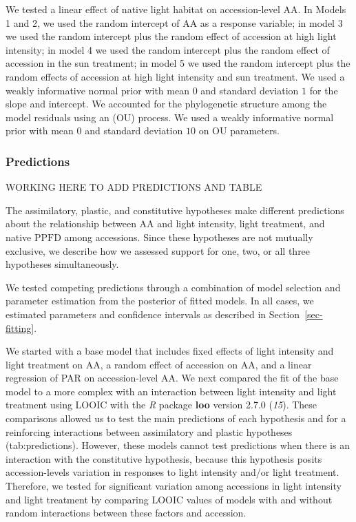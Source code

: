\documentclass[
  letterpaper,
  DIV=11,
  numbers=noendperiod]{scrartcl}
\newcommand{\aax}{$\mathrm{AA}$}
\newcommand{\ppfd}{$\mathrm{PPFD}$}
\begin{document}
We tested a linear effect of native light habitat on accession-level
\aax. In Models 1 and 2, we used the random intercept of \aax{} as a
response variable; in model 3 we used the random intercept plus the
random effect of accession at high light intensity; in model 4 we used
the random intercept plus the random effect of accession in the sun
treatment; in model 5 we used the random intercept plus the random
effects of accession at high light intensity and sun treatment. We used
a weakly informative normal prior with mean \(0\) and standard deviation
\(1\) for the slope and intercept. We accounted for the phylogenetic
structure among the model residuals using an (OU) process. We used a
weakly informative normal prior with mean \(0\) and standard deviation
\(10\) on OU parameters.

\subsubsection{Predictions}\label{sec-predictions}

WORKING HERE TO ADD PREDICTIONS AND TABLE

The assimilatory, plastic, and constitutive hypotheses make different
predictions about the relationship between \aax{} and light intensity,
light treatment, and native \ppfd{} among accessions. Since these
hypotheses are not mutually exclusive, we describe how we assessed
support for one, two, or all three hypotheses simultaneously.

We tested competing predictions through a combination of model selection
and parameter estimation from the posterior of fitted models. In all
cases, we estimated parameters and confidence intervals as described in
Section~\ref{sec-fitting}.

We started with a base model that includes fixed effects of light
intensity and light treatment on \aax, a random effect of accession on
\aax, and a linear regression of PAR on accession-level \aax. We next
compared the fit of the base model to a more complex with an interaction
between light intensity and light treatment using LOOIC with the
\textit{R} package \textbf{loo} version 2.7.0 (\emph{15}). These
comparisons allowed us to test the main predictions of each hypothesis
and for a reinforcing interactions between assimilatory and plastic
hypotheses (tab:predictions). However, these models cannot test
predictions when there is an interaction with the constitutive
hypothesis, because this hypothesis posits accession-levels variation in
responses to light intensity and/or light treatment. Therefore, we
tested for significant variation among accessions in light intensity and
light treatment by comparing LOOIC values of models with and without
random interactions between these factors and accession.
\end{document}
